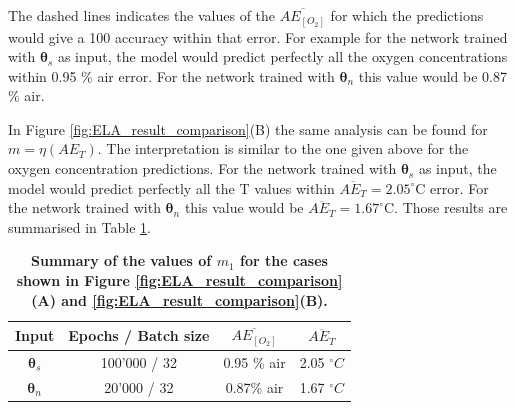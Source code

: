\documentclass[9pt,twocolumn,twoside,pdftex]{optica}
\begin{document}
The dashed lines indicates the values of the $\overline{AE_{[O_2]}}$ for which the predictions would give a 100 accuracy within that error. For example for the network trained with ${\pmb \theta}_s$ as input, the model would predict perfectly all the oxygen concentrations within 0.95 \% air error. For the network trained with ${\pmb \theta}_n$ this value would be 0.87 \% air. 

In Figure \ref{fig:ELA_result_comparison}(B) the same analysis can be found for $m=\eta(AE_T)$. The interpretation is similar to the one given above for the oxygen concentration predictions. For the network trained with ${\pmb \theta}_s$ as input, the model would predict perfectly all the T values within $\overline{AE_{T}}=2.05^\circ$C error. For the network trained with ${\pmb \theta}_n$ this value would be $\overline{AE_{T}}=1.67^\circ$C. Those results are summarised in Table \ref{table:ela}.

\begin{table}[t!]
\centering
\caption {\bf Summary of the values of $m_1$ for the cases shown in Figure \ref{fig:ELA_result_comparison}(A) and \ref{fig:ELA_result_comparison}(B).}

\begin{tabular}{ cccc}
\smallskip 
 Input & Epochs / Batch size & $\overline{AE_{[O_2]}}$ & $\overline{AE_{T}}$  \\ 
 \hline
${\pmb \theta}_s$ & 100'000 / 32 & 0.95 \% air & 2.05 $^\circ C$\\ 
${\pmb \theta}_n $ & 20'000 / 32 & 0.87\% air & 1.67 $^\circ C$\\ 

\end{tabular}
\label{table:ela}
\end{table}


\end{document}
